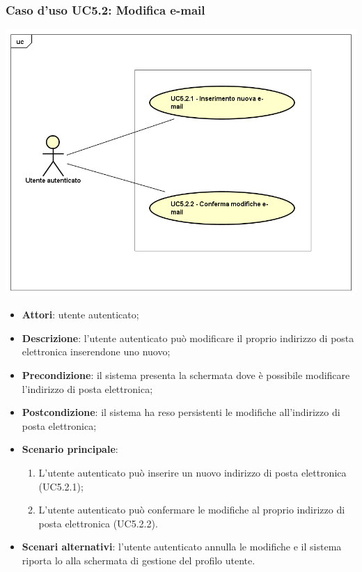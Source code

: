 \subsubsection{Caso d'uso UC5.2: Modifica e-mail}
\begin{center}
	\includegraphics[scale=0.5]{UML/UC5_2.png}
\end{center}

\begin{itemize}
	\item \textbf{Attori}: utente autenticato;
	\item \textbf{Descrizione}: l'utente autenticato può modificare il proprio indirizzo di posta elettronica inserendone uno nuovo;
	\item \textbf{Precondizione}: il sistema presenta la schermata dove è possibile modificare l'indirizzo di posta elettronica;
	\item \textbf{Postcondizione}: il sistema ha reso persistenti le modifiche all'indirizzo di posta elettronica;
	\item \textbf{Scenario principale}:
		\begin{enumerate}
			\item L'utente autenticato può inserire un nuovo indirizzo di posta elettronica (UC5.2.1);
			\item L'utente autenticato può confermare le modifiche al proprio indirizzo di posta elettronica (UC5.2.2).
		\end{enumerate}
	\item \textbf{Scenari alternativi}: l'utente autenticato annulla le modifiche e il sistema riporta lo alla schermata di gestione del profilo utente.
\end{itemize}

